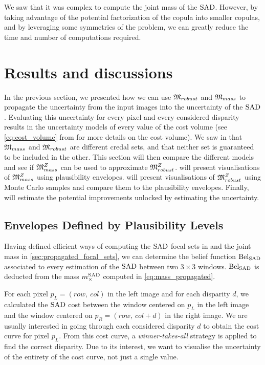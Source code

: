 We saw that it was complex to compute the joint mass of the $\mathrm{SAD}$. However, by taking advantage of the potential factorization of the copula into smaller copulas, and by leveraging some symmetries of the problem, we can greatly reduce the time and number of computations required.

\section{Results and discussions}
In the previous section, we presented how we can use $\mathfrak{M}_{robust}$ and $\mathfrak{M}_{mass}$ to propagate the uncertainty from the input images into the uncertainty of the $\mathrm{SAD}$. Evaluating this uncertainty for every pixel and every considered disparity results in the uncertainty models of every value of the cost volume (see \cref{eq:cost_volume} from  for more details on the cost volume). We saw in  that $\mathfrak{M}_{mass}$ and $\mathfrak{M}_{robust}$ are different credal sets, and that neither set is guaranteed to be included in the other. This section will then compare the different models and see if $\mathfrak{M}^Z_{mass}$ can be used to approximate $\mathfrak{M}^Z_{robust}$.  will present visualisations of  $\mathfrak{M}^Z_{mass}$ using plausibility envelopes.  will present visualisations of $\mathfrak{M}^Z_{robust}$ using Monte Carlo samples and compare them to the plausibility envelopes. Finally,  will estimate the potential improvements unlocked by estimating the uncertainty.

\subsection{Envelopes Defined by Plausibility Levels}\label{sec:envelopes_plausibility}
Having defined efficient ways of computing the $\mathrm{SAD}$ focal sets in  and the joint mass in \ref{sec:propagated_focal_sets}, we can determine the belief function $\mathrm{Bel}_{\mathrm{SAD}}$ associated to every estimation of the $\mathrm{SAD}$ between two $3\times3$ windows. $\mathrm{Bel}_{\mathrm{SAD}}$ is deducted from the mass $m^{\mathrm{SAD}}_\times$ computed in \cref{eq:mass_propagated}.

For each pixel $p_L=(row, ~col)$ in the left image and for each disparity $d$, we calculated the $\mathrm{SAD}$ cost between the window centered on $p_L$ in the left image and the window centered on $p_R=(row, ~col+d)$ in the right image. We are usually interested in going through each considered disparity $d$ to obtain the cost curve for pixel $p_L$. From this cost curve, a \textit{winner-takes-all} strategy is applied to find the correct disparity. Due to its interest, we want to visualise the uncertainty of the entirety of the cost curve, not just a single value.


